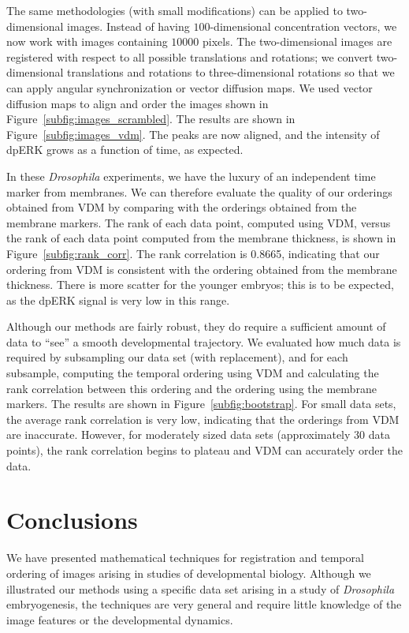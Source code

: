 \documentclass{pnastwo}
\begin{document}
\begin{article}
The same methodologies (with small modifications) can be applied to two-dimensional images.
%
Instead of having $100$-dimensional concentration vectors, we now work with images containing $10000$ pixels.
%
The two-dimensional images are registered with respect to all possible translations and rotations; 
we convert two-dimensional translations and rotations to three-dimensional rotations so that we can apply angular synchronization or vector diffusion maps. 
%
We used vector diffusion maps to align and order the images shown in Figure~\ref{subfig:images_scrambled}.
%
The results are shown in Figure~\ref{subfig:images_vdm}.
%
The peaks are now aligned, and the intensity of dpERK grows as a function of time, as expected.

In these {\em Drosophila} experiments, we have the luxury of an independent time marker from membranes.
%
We can therefore evaluate the quality of our orderings obtained from VDM by comparing with the orderings obtained from the membrane markers.
%
The rank of each data point, computed using VDM, versus the rank of each data point computed from the membrane thickness, is shown in Figure~\ref{subfig:rank_corr}.
%
The rank correlation is 0.8665, indicating that our ordering from VDM is consistent with the ordering obtained from the membrane thickness.
%
There is more scatter for the younger embryos; this is to be expected, as the dpERK signal is very low in this range.

Although our methods are fairly robust, they do require a sufficient amount of data to ``see'' a smooth developmental trajectory.
%
We evaluated how much data is required by subsampling our data set (with replacement), and for each subsample, computing the temporal ordering using VDM and calculating the rank correlation between this ordering and the ordering using the membrane markers.
%
The results are shown in Figure~\ref{subfig:bootstrap}.
%
For small data sets, the average rank correlation is very low, indicating that the orderings from VDM are inaccurate. 
%
However, for moderately sized data sets (approximately 30 data points), the 
rank correlation begins to plateau and VDM can accurately order the data.

\section{Conclusions}

We have presented mathematical techniques for registration and temporal ordering of images arising in studies of developmental biology.
%
Although we illustrated our methods using a specific data set arising in a study of {\em Drosophila} embryogenesis, the techniques are very general and require little knowledge of the image features or the developmental dynamics.


\end{article}
\end{document}
